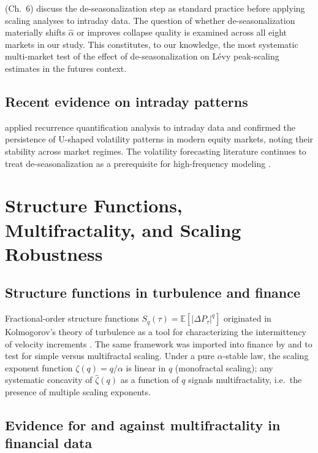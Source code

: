 \documentclass[12pt,a4paper]{article}
\begin{document}
\textcite{BouchaudPotters2003} (Ch.~6) discuss the de-seasonalization step as
standard practice before applying scaling analyses to intraday data. The
question of whether de-seasonalization materially shifts $\hat\alpha$
or improves collapse quality is examined across all eight markets in our
study. This constitutes, to our knowledge, the most systematic multi-market
test of the effect of de-seasonalization on Lévy peak-scaling estimates in the
futures context.

\subsection{Recent evidence on intraday patterns}

\textcite{Kadioglu2023} applied recurrence quantification analysis to intraday
data and confirmed the persistence of U-shaped volatility patterns in modern
equity markets, noting their stability across market regimes. The volatility
forecasting literature continues to treat de-seasonalization as a prerequisite
for high-frequency modeling \parencite{ParkEomKim2022,LiangWan2023}.


\section{Structure Functions, Multifractality, and Scaling Robustness}
\label{sec:structure}

\subsection{Structure functions in turbulence and finance}

Fractional-order structure functions $S_q(\tau) = \mathbb{E}[|\Delta P_\tau|^q]$
originated in Kolmogorov's theory of turbulence as a tool for characterizing
the intermittency of velocity increments \parencite{Kolmogorov1941}. The same
framework was imported into finance by \textcite{MuzyBacry1993,MuzyBacry1994}
and \textcite{Mandelbrot1997} to test for simple versus multifractal scaling.
Under a pure $\alpha$-stable law, the scaling exponent function $\zeta(q) =
q/\alpha$ is linear in $q$ (monofractal scaling); any systematic concavity of
$\hat\zeta(q)$ as a function of $q$ signals multifractality, i.e.\ the
presence of multiple scaling exponents.

\subsection{Evidence for and against multifractality in financial data}
\end{document}
